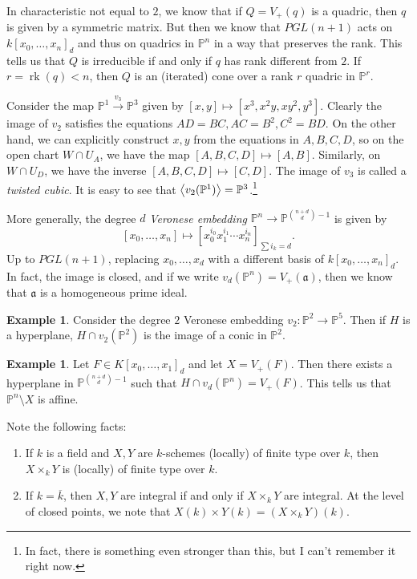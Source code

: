 \documentclass[leqno, openany]{memoir}
\theoremstyle{definition}
\newtheorem{exm}[thm]{Example}
\theoremstyle{remark}
\theoremstyle{plain}
\theoremstyle{definition}
\theoremstyle{remark}
\renewcommand{\P}{\mathbb{P}}
\newcommand{\mf}[1]{\mathfrak{#1}}
\newcommand{\ol}[1]{\overline{#1}}
\begin{document}
In characteristic not equal to $2$, we know that if $Q = V_+(q)$ is a quadric,
then $q$ is given by a symmetric matrix. But then we know that $PGL(n+1)$ acts
on ${k[x_0, \ldots, x_n]}_d$ and thus on quadrics in $\P^n$ in a way that
preserves the rank. This tells us that $Q$ is irreducible if and only if $q$
has rank different from $2$. If $r = \operatorname{rk}(q) < n$, then $Q$ is an
(iterated) cone over a rank $r$ quadric in $\P^r$.

Consider the map $\P^1 \xrightarrow{v_3} \P^3$ given by $[x,y] \mapsto [x^3,
x^2y, xy^2, y^3]$. Clearly the image of $v_2$ satisfies the equations $AD = BC,
AC = B^2, C^2 = BD$. On the other hand, we can explicitly construct $x,y$ from
the equations in $A,B,C,D$, so on the open chart $W \cap U_A$, we have the map
$[A,B,C,D] \mapsto [A,B]$. Similarly, on $W \cap U_D$, we have the inverse
$[A,B,C,D] \mapsto [C,D]$. The image of $v_3$ is called a \textit{twisted
cubic}. It is easy to see that $\ev{v_2(\P^1)} = \P^3$.\footnote{In fact, there
is something even stronger than this, but I can't remember it right now.} 

More generally, the degree $d$ \textit{Veronese embedding} $\P^n \to
\P^{\binom{n+d}{d}-1}$ is given by \[ {[x_0, \ldots, x_n] \mapsto
[x_0^{i_0}x_1^{i_1}\cdots x_n^{i_n}]}_{\sum i_k = d}. \] Up to $PGL(n+1)$,
replacing $x_0, \ldots, x_d$ with a different basis of ${k[x_0, \ldots,
x_n]}_d$. In fact, the image is closed, and if we write $v_d(\P^n) =
V_+(\mf{a})$, then we know that $\mf{a}$ is a homogeneous prime ideal.

\begin{exm} Consider the degree $2$ Veronese embedding $v_2 \colon \P^2 \to
\P^5$. Then if $H$ is a hyperplane, $H \cap v_2(\P^2)$ is the image of a conic
in $\P^2$.  \end{exm}

\begin{exm} Let $F \in {K[x_0, \ldots, x_1]}_d$ and let $X = V_+(F)$. Then
there exists a hyperplane in $\P^{\binom{n+d}{d}-1}$ such that $H \cap
v_d(\P^n) = V_+(F)$. This tells us that $\P^n \setminus X$ is affine.
\end{exm}

Note the following facts: \begin{enumerate} \item If $k$ is a field and $X,Y$
    are $k$-schemes (locally) of finite type over $k$, then $X \times_k Y$ is
    (locally) of finite type over $k$.  \item If $k = \ol{k}$, then $X,Y$ are
    integral if and only if $X \times_k Y$ are integral. At the level of closed
    points, we note that $X(k) \times Y(k) = (X \times_k Y)(k)$.
    \end{enumerate}
\end{document}

